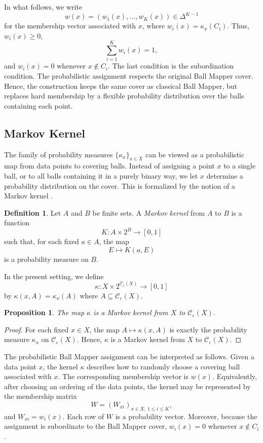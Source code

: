 \documentclass[9pt,a4paper,twocolumn,twoside]{extarticle}
\newtheorem{proposition}[theorem]{Proposition}
\theoremstyle{definition}
\newtheorem{definition}[theorem]{Definition}
\begin{document}
In what follows, we write
\[
w(x) = (w_1(x),\dots,w_K(x)) \in \Delta^{K-1}
\]
for the membership vector associated with $x$, where $w_i(x)=\kappa_x({C_i})$. Thus, $w_i(x)\ge 0$,
\[
\sum_{i=1}^K w_i(x)=1,
\]
and
$w_i(x)=0$ whenever $x\notin C_i$. The last condition is the subordination condition. The probabilistic assignment respects the original Ball Mapper cover. Hence, the construction keeps the same cover as classical Ball Mapper, but replaces hard membership by a flexible probability distribution over the balls containing each point.

\subsection{Markov Kernel}

The family of probability measures $\{\kappa_x\}_{x\in X}$ can be viewed as a probabilistic map from data points to covering balls. Instead of assigning a point $x$ to a single ball, or to all balls containing it in a purely binary way, we let $x$ determine a probability distribution on the cover. This is formalized by the notion of a Markov kernel \cite{Kallenberg2021}.

\begin{definition}
Let $A$ and $B$ be finite sets. A \emph{Markov kernel} from $A$ to $B$ is a function
\[
K:A\times 2^B\to[0,1]
\]
such that, for each fixed $a\in A$, the map
\[
E\mapsto K(a,E)
\]
is a probability measure on $B$.
\end{definition}

In the present setting, we define
\[
\kappa:X\times 2^{\mathcal C_\varepsilon(X)}\to[0,1]
\]
by $\kappa(x,A)=\kappa_x(A)$ where $A\subseteq \mathcal C_\varepsilon(X)$.

\begin{proposition}
The map $\kappa$ is a Markov kernel from $X$ to $\mathcal C_\varepsilon(X)$.
\end{proposition}

\begin{proof}
For each fixed $x\in X$, the map $A\mapsto \kappa(x,A)$ is exactly the probability measure $\kappa_x$ on $\mathcal C_\varepsilon(X)$. Hence, $\kappa$ is a Markov kernel from $X$ to $\mathcal C_\varepsilon(X)$.
\end{proof}

The probabilistic Ball Mapper assignment can be interpreted as follows. Given a data point $x$, the kernel $\kappa$ describes how to randomly choose a covering ball associated with $x$. The corresponding membership vector is $w(x)$. Equivalently, after choosing an ordering of the data points, the kernel may be represented by the membership matrix
\[
W=(W_{xi})_{x\in X,\ 1\le i\le K},
\]
and $W_{xi}=w_i(x)$. Each row of $W$ is a probability vector. Moreover, because the assignment is subordinate to the Ball Mapper cover, $w_i(x) = 0$ whenever $x\notin C_i$.
\end{document}
